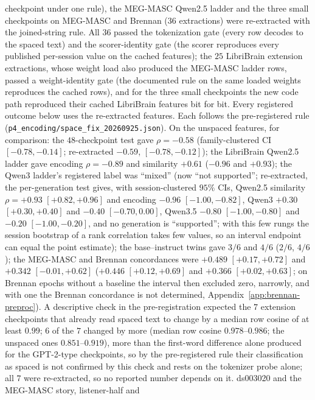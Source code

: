 \documentclass{article}
\begin{document}
checkpoint under one rule), the MEG-MASC Qwen2.5 ladder and the three small checkpoints on MEG-MASC
and Brennan ($36$ extractions) were re-extracted with the joined-string rule. All $36$ passed the
tokenization gate (every row decodes to the spaced text) and the scorer-identity gate (the scorer
reproduces every published per-session value on the cached features); the $25$ LibriBrain extension
extractions, whose weight load also produced the MEG-MASC ladder rows, passed a weight-identity gate
(the documented rule on the same loaded weights reproduces the cached rows), and for the three small
checkpoints the new code path reproduced their cached LibriBrain features bit for bit. Every registered outcome
below uses the re-extracted features. Each follows the pre-registered rule
(\texttt{p4\_encoding/space\_fix\_20260925.json}). On the unspaced features, for comparison: the
$48$-checkpoint test gave $\rho=-0.58$ (family-clustered CI $[-0.78,-0.14]$; re-extracted $-0.59$,
$[-0.78,-0.12]$); the LibriBrain Qwen2.5 ladder gave encoding $\rho=-0.89$ and similarity $+0.61$
($-0.96$ and $+0.93$); the Qwen3 ladder's registered label was ``mixed'' (now ``not supported''; re-extracted, the
per-generation test gives, with session-clustered $95\%$ CIs, Qwen2.5 similarity $\rho=+0.93$
$[+0.82,+0.96]$ and encoding $-0.96$ $[-1.00,-0.82]$, Qwen3 $+0.30$ $[+0.30,+0.40]$ and $-0.40$
$[-0.70,0.00]$, Qwen3.5 $-0.80$ $[-1.00,-0.80]$ and $-0.20$ $[-1.00,-0.20]$, and no generation is
``supported''; with this few rungs the session bootstrap of a rank correlation takes few values, so an interval endpoint can equal the point estimate);
the base--instruct twins gave $3/6$ and $4/6$ ($2/6$, $4/6$); the MEG-MASC and Brennan
concordances were $+0.489$ $[+0.17,+0.72]$ and $+0.342$ $[-0.01,+0.62]$ ($+0.446$ $[+0.12,+0.69]$
and $+0.366$ $[+0.02,+0.63]$; on Brennan epochs without a baseline the interval then excluded zero,
narrowly, and with one the Brennan concordance is not determined, Appendix~\ref{app:brennan-preproc}). A descriptive check
in the pre-registration expected the $7$ extension checkpoints that already read spaced text to
change by a median row cosine of at least $0.99$; $6$ of the $7$ changed by more (median row cosine $0.978$--$0.986$;
the unspaced ones $0.851$--$0.919$), more than the first-word difference alone produced for the
GPT-2-type checkpoints, so by the pre-registered rule their classification as spaced is not confirmed by this check and
rests on the tokenizer probe alone; all $7$ were re-extracted, so no reported number depends on it. ds003020 and the MEG-MASC story, listener-half and
\end{document}
